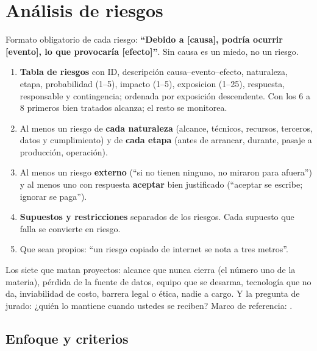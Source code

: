 
\chapter{Análisis de riesgos}\label{cap:riesgos}

\begin{guia}
Formato obligatorio de cada riesgo: \textbf{``Debido a [causa], podría
ocurrir [evento], lo que provocaría [efecto]''}. Sin causa es un miedo,
no un riesgo.
\begin{enumerate}
    \item \textbf{Tabla de riesgos} con ID, descripción causa--evento--efecto,
          naturaleza, etapa, probabilidad (1--5), impacto (1--5),
          \gls{exposicion} (1--25), respuesta, responsable y contingencia;
          ordenada por exposición descendente. Con los 6 a 8 primeros bien
          tratados alcanza; el resto se monitorea.
    \item Al menos un riesgo de \textbf{cada naturaleza} (alcance, técnicos,
          recursos, terceros, datos y cumplimiento) y de \textbf{cada etapa}
          (antes de arrancar, durante, pasaje a producción, operación).
    \item Al menos un riesgo \textbf{externo} (``si no tienen ninguno, no
          miraron para afuera'') y al menos uno con respuesta
          \textbf{aceptar} bien justificado (``aceptar se escribe; ignorar
          se paga'').
    \item \textbf{Supuestos y restricciones} separados de los riesgos. Cada
          supuesto que falla se convierte en riesgo.
    \item Que sean propios: ``un riesgo copiado de internet se nota a tres
          metros''.
\end{enumerate}
Los siete que matan proyectos: alcance que nunca cierra (el número uno
de la materia), pérdida de la fuente de datos, equipo que se desarma,
tecnología que no da, inviabilidad de costo, barrera legal o ética,
nadie a cargo. Y la pregunta de jurado: ¿quién lo mantiene cuando
ustedes se reciben? Marco de referencia: \citet{pmi2021}.
\end{guia}

\section{Enfoque y criterios}

